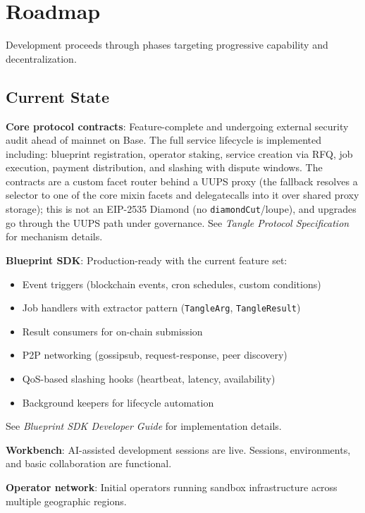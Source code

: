 \documentclass[11pt,a4paper]{article}
\begin{document}
\section{Roadmap}

Development proceeds through phases targeting progressive capability and decentralization.

\subsection{Current State}

\textbf{Core protocol contracts}: Feature-complete and undergoing external security audit ahead of mainnet on Base. The full service lifecycle is implemented including: blueprint registration, operator staking, service creation via RFQ, job execution, payment distribution, and slashing with dispute windows. The contracts are a custom facet router behind a UUPS proxy (the fallback resolves a selector to one of the core mixin facets and delegatecalls into it over shared proxy storage); this is not an EIP-2535 Diamond (no \texttt{diamondCut}/loupe), and upgrades go through the UUPS path under governance. See \textit{Tangle Protocol Specification} for mechanism details.

\textbf{Blueprint SDK}: Production-ready with the current feature set:
\begin{itemize}[noitemsep]
    \item Event triggers (blockchain events, cron schedules, custom conditions)
    \item Job handlers with extractor pattern (\texttt{TangleArg}, \texttt{TangleResult})
    \item Result consumers for on-chain submission
    \item P2P networking (gossipsub, request-response, peer discovery)
    \item QoS-based slashing hooks (heartbeat, latency, availability)
    \item Background keepers for lifecycle automation
\end{itemize}
See \textit{Blueprint SDK Developer Guide} for implementation details.

\textbf{Workbench}: AI-assisted development sessions are live. Sessions, environments, and basic collaboration are functional.

\textbf{Operator network}: Initial operators running sandbox infrastructure across multiple geographic regions.
\end{document}
